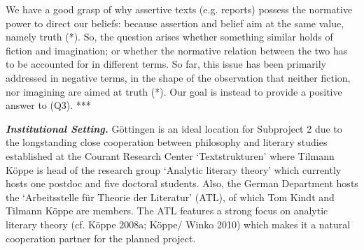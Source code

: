 \noindent We have a good grasp of why assertive texts (e.g. reports) possess the normative power to direct our beliefs: because assertion and belief aim at the same value, namely truth (*). So, the question arises whether something similar holds of fiction and imagination; or whether the normative relation between the two has to be accounted for in different terms. So far, this issue has been primarily addressed in negative terms, in the shape of the observation that neither fiction, nor imagining are aimed at truth (*). Our goal is instead to provide a positive answer to (Q3). ***



\vspace{.2cm}
\noindent\textbf{\emph{Institutional Setting.}} G\"ottingen is an ideal location for Subproject 2 due to the longstanding close cooperation between philosophy and literary studies established at the Courant Research Center `Textstrukturen' where Tilmann K\"oppe is
head of the research group `Analytic literary theory' which currently
hosts one postdoc and five doctoral students. Also, the German
Department hosts the `Arbeitsstelle f\"ur Theorie der Literatur' (ATL),
of which Tom Kindt and Tilmann K\"oppe are members. The ATL features a
strong focus on analytic literary theory (cf. K\"oppe 2008a; K\"oppe/ Winko
2010) which makes it a natural cooperation partner for the planned
project.